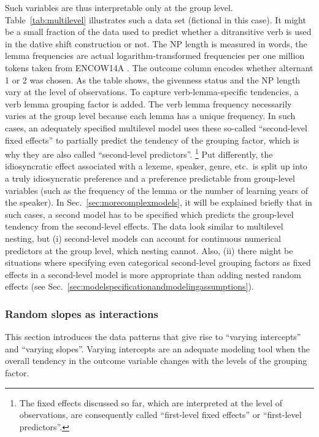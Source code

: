 Such variables are thus interpretable only at the group level.
Table~\ref{tab:multilevel} illustrates such a data set (fictional in this case).
It might be a small fraction of the data used to predict whether a ditransitive verb is used in the dative shift construction or not.
The NP length is measured in words, the lemma frequencies are actual logarithm-transformed frequencies per one million tokens taken from ENCOW14A \citep{SchaeferBildhauer2012}.
The outcome column encodes whether alternant 1 or 2 was chosen.
As the table shows, the givenness status and the NP length vary at the level of observations.
To capture verb-lemma-specific tendencies, a verb lemma grouping factor is added.
The verb lemma frequency necessarily varies at the group level because each lemma has a unique frequency.
In such cases, an adequately specified multilevel model uses these so-called ``second-level fixed effects'' to partially predict the tendency of the grouping factor, which is why they are also called ``second-level predictors''.%
\footnote{The fixed effects discussed so far, which are interpreted at the level of observations, are consequently called ``first-level fixed effects'' or ``first-level predictors''.}
Put differently, the idiosyncratic effect associated with a lexeme, speaker, genre, etc.\ is split up into a truly idiosyncratic preference and a preference predictable from group-level variables (such as the frequency of the lemma or the number of learning years of the speaker).
In Sec.~\ref{sec:morecomplexmodels}, it will be explained briefly that in such cases, a second model has to be specified which predicts the group-level tendency from the second-level effects.
The data look similar to multilevel nesting, but (i) second-level models can account for continuous numerical predictors at the group level, which nesting cannot.
Also, (ii) there might be situations where specifying even categorical second-level grouping factors as fixed effects in a second-level model is more appropriate than adding nested random effects (see Sec.~\ref{sec:modelspecificationandmodelingassumptions}).


\subsubsection{Random slopes as interactions}
\label{sec:randominterceptsandslopes}

This section introduces the data patterns that give rise to ``varying intercepts'' and ``varying slopes''. 
Varying intercepts are an adequate modeling tool when the overall tendency in the outcome variable changes with the levels of the grouping factor.

